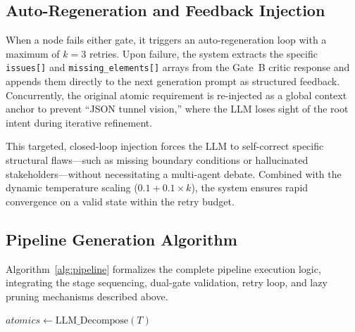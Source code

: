 \documentclass[journal]{IEEEtran}
\begin{document}
\subsection{Auto-Regeneration and Feedback Injection}
When a node fails either gate, it triggers an auto-regeneration loop with a maximum of $k=3$ retries. Upon failure, the system extracts the specific \texttt{issues[]} and \texttt{missing\_elements[]} arrays from the Gate~B critic response and appends them directly to the next generation prompt as structured feedback. Concurrently, the original atomic requirement is re-injected as a global context anchor to prevent ``JSON tunnel vision,'' where the LLM loses sight of the root intent during iterative refinement.

This targeted, closed-loop injection forces the LLM to self-correct specific structural flaws---such as missing boundary conditions or hallucinated stakeholders---without necessitating a multi-agent debate. Combined with the dynamic temperature scaling ($0.1 + 0.1 \times k$), the system ensures rapid convergence on a valid state within the retry budget.

\subsection{Pipeline Generation Algorithm}
Algorithm~\ref{alg:pipeline} formalizes the complete pipeline execution logic, integrating the stage sequencing, dual-gate validation, retry loop, and lazy pruning mechanisms described above.

\begin{algorithm}[ht]
\caption{Vertical Dual-Gate Tree Generation}
\label{alg:pipeline}
$atomics \leftarrow \text{LLM\_Decompose}(T)$\;
\end{algorithm}
\end{document}
